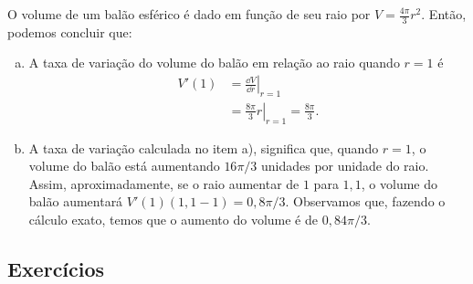 \begin{ex}
  O volume de um balão esférico é dado em função de seu raio por $\displaystyle V = \frac{4\pi}{3}r^2$. Então, podemos concluir que:
  \begin{enumerate}[a)]
  \item A taxa de variação do volume do balão em relação ao raio quando $r=1$ é
    \begin{align}
      V'(1) &= \left.\frac{\dd V}{\dd r}\right|_{r=1}\\
            &= \left.\frac{8\pi}{3}r\right|_{r=1} = \frac{8\pi}{3}.
    \end{align}
  \item A taxa de variação calculada no item a), significa que, quando $r=1$, o volume do balão está aumentando $16\pi/3$ unidades por unidade do raio. Assim, aproximadamente, se o raio aumentar de $1$ para $1,1$, o volume do balão aumentará $V'(1)(1,1-1) = 0,8\pi/3$. Observamos que, fazendo o cálculo exato, temos que o aumento do volume é de $0,84\pi/3$. 
  \end{enumerate}
\end{ex}

\subsection*{Exercícios}

\emconstrucao